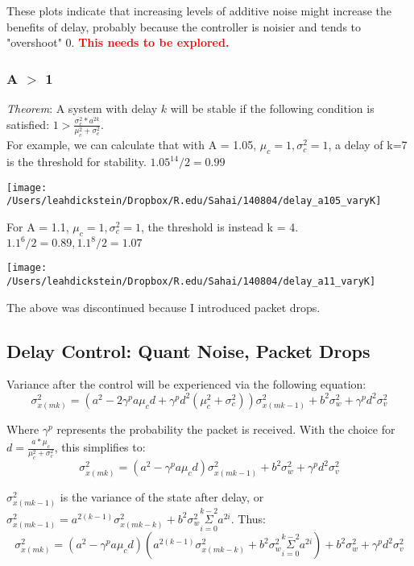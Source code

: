 \documentclass[leqno,twocolumn]{article}
\begin{document}
These plots indicate that increasing levels of additive noise might increase the benefits of delay, probably because the controller is noisier and tends to "overshoot" 0. \textcolor{red}{\textbf{This needs to be explored.}}

\subsubsection{A $>$ 1}
\textit{Theorem}: A system with delay $k$ will be stable if the following condition is satisfied: $1 > \frac{\sigma_c^2*a^{2k}}{\mu_c^2+\sigma_c^2}$.\\

For example, we can calculate that with A = 1.05, $\mu_c = 1, \sigma_c^2 = 1$, a delay of k=7 is the threshold for stability. $1.05^{14}/2 = 0.99$

\begin{center}
\texttt{[image: /Users/leahdickstein/Dropbox/R.edu/Sahai/140804/delay\_a105\_varyK]}\end{center}

For A = 1.1, $\mu_c = 1, \sigma_c^2=1$, the threshold is instead k = 4. $1.1^6/2 = 0.89, 1.1^8/2 = 1.07$

\begin{center}
\texttt{[image: /Users/leahdickstein/Dropbox/R.edu/Sahai/140804/delay\_a11\_varyK]}\end{center}

The above was discontinued because I introduced packet drops.

\subsection{Delay Control: Quant Noise, Packet Drops}
Variance after the control will be experienced via the following equation:
\[ \sigma_{x(mk)}^2 = (a^2 -2\gamma^p a\mu_c d + \gamma^p d^2(\mu_c^2 +\sigma_c^2))\sigma_{x(mk-1)}^2 +b^2\sigma_w^2 + \gamma^p d^2\sigma_v^2 \]

Where $\gamma^p$ represents the probability the packet is received. With the choice for $d = \frac{a*\mu_c}{\mu_c^2 + \sigma_c^2}$, this simplifies to:
\[\sigma_{x(mk)}^2 = (a^2 -\gamma^p a\mu_c d)\sigma_{x(mk-1)}^2 +b^2\sigma_w^2 + \gamma^p d^2\sigma_v^2 \]

$\sigma_{x(mk-1)}^2$ is the variance of the state after delay, or $\sigma_{x(mk-1)}^2 = a^{2(k-1)}\sigma_{x(mk-k)}^2 + b^2\sigma_w^2\overset{k-2}{\underset{i=0}{\Sigma}}a^{2i}$. Thus:
\[\sigma_{x(mk)}^2 = (a^2 -\gamma^p a\mu_c d)\left(a^{2(k-1)}\sigma_{x(mk-k)}^2 + b^2\sigma_w^2\overset{k-2}{\underset{i=0}{\Sigma}}a^{2i}\right) +b^2\sigma_w^2 + \gamma^p d^2\sigma_v^2 \]
\end{document}
